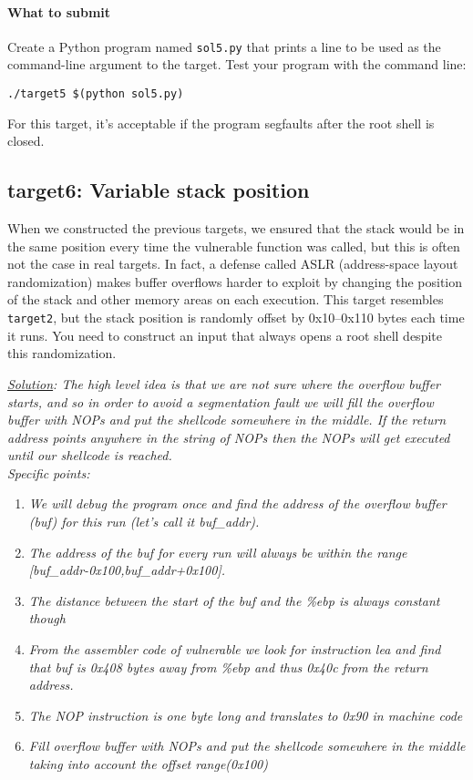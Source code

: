 \documentclass[letterpaper,12pt]{report}
\begin{document}
{\paragraph{What to submit}
Create a Python program named \texttt{sol5.py} that prints a line to be used as the command-line argument to the target.  Test your program with the command line:

\smallskip

\quad\texttt{./target5 \$(python sol5.py)}

\medskip

For this target, it's acceptable if the program segfaults after the root shell is closed.

\subsection*{target6: Variable stack position }
\label{sec:target6}

When we constructed the previous targets, we ensured that the stack would be in the same position every time the vulnerable function was called, but this is often not the case in real targets.  In fact, a defense called ASLR (address-space layout randomization) makes buffer overflows harder to exploit by changing the position of the stack and other memory areas on each execution.  This target resembles \texttt{target2}, but the stack position is randomly offset by 0x10--0x110 bytes each time it runs.  You need to construct an input that always opens a root shell despite this randomization.


\smallskip

\textit{\underline{Solution}: The high level idea is that we are not sure where the overflow buffer starts, and so in order to avoid a segmentation fault we will fill the overflow buffer with NOPs and put the shellcode somewhere in the middle. If the return address points anywhere in the string of NOPs then the NOPs will get executed until our shellcode is reached. \\ 
Specific points:
}
\begin{enumerate}
\item \textit{We will debug the program once and find the address of the overflow buffer (buf) for this run (let's call it buf\_addr).}
\item \textit{The address of the buf for every run will always be within the range [buf\_addr-0x100,buf\_addr+0x100].}
\item \textit{The distance between the start of the buf and the \%ebp is always constant though}
\item \textit{From the assembler code of vulnerable we look for instruction lea and find that buf is 0x408 bytes away from \%ebp and thus 0x40c from the return address.}
\item \textit{The NOP instruction is one byte long and translates to 0x90 in machine code}
\item \textit{Fill overflow buffer with NOPs and put the shellcode somewhere in the middle taking into account the offset range(0x100)}
\end{enumerate}


}
\end{document}
